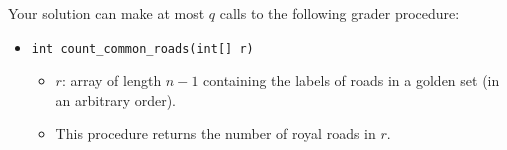 Your solution can make at most $q$ calls to the following grader procedure:

\begin{itemize}
\item \texttt{int count\_common\_roads(int[] r)}
\begin{itemize}
\item $r$: array of length $n - 1$ containing the labels of roads in a golden set (in an arbitrary order).
\item This procedure returns the number of royal roads in $r$.
\end{itemize}
\end{itemize}

